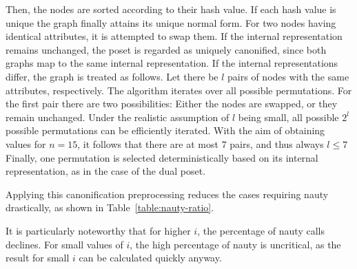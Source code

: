 \documentclass[10pt,journal,compsoc]{IEEEtran}
\begin{document}
Then, the nodes are sorted according to their hash value.
If each hash value is unique the graph finally attains its unique normal form.
For two nodes having identical attributes, it is attempted to swap them.
If the internal representation remains unchanged, the poset is regarded as uniquely canonified, since both graphs map to the same internal representation.
If the internal representations differ, the graph is treated as follows.
Let there be $l$ pairs of nodes with the same attributes, respectively.
The algorithm iterates over all possible permutations.
For the first pair there are two possibilities: Either the nodes are swapped, or they remain unchanged.
Under the realistic assumption of $l$ being small, all possible $2^l$ possible permutations can be efficiently iterated.
With the aim of obtaining values for $n = 15$, it follows that there are at most $7$ pairs, and thus always $l \leq 7$
Finally, one permutation is selected deterministically based on its internal representation, as in the case of the dual poset.

Applying this canonification preprocessing reduces the cases requiring nauty drastically, as shown in Table~\ref{table:nauty-ratio}.

\begin{table}[!t]
  \renewcommand{\arraystretch}{1.2}
  \caption{Percentage in which nauty was required for canonification for variable $n$ and $i$, lower is better}
  \label{table:nauty-ratio}
  \centering
\end{table}

It is particularly noteworthy that for higher $i$, the percentage of nauty calls declines.
For small values of $i$, the high percentage of nauty is uncritical, as the result for small $i$ can be calculated quickly anyway.
\end{document}
